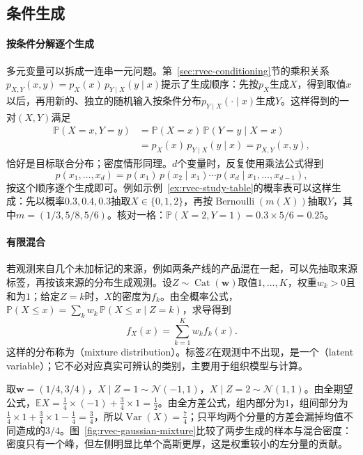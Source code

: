 \subsection{条件生成}

\paragraph{按条件分解逐个生成}
多元变量可以拆成一连串一元问题。第~\ref{sec:rvec-conditioning}节的乘积关系$p_{X,Y}(x,y)=p_X(x)\,p_{Y\mid X}(y\mid x)$提示了生成顺序：先按$p_X$生成$X$，得到取值$x$以后，再用新的、独立的随机输入按条件分布$p_{Y\mid X}(\cdot\mid x)$生成$Y$。这样得到的一对$(X,Y)$满足
\[
\begin{aligned}
 \mathbb P(X=x,Y=y)&=\mathbb P(X=x)\,\mathbb P(Y=y\mid X=x)\\
 &=p_X(x)\,p_{Y\mid X}(y\mid x)=p_{X,Y}(x,y),
\end{aligned}
\]
恰好是目标联合分布；密度情形同理。$d$个变量时，反复使用乘法公式得到
\[
 p(x_1,\ldots,x_d)=p(x_1)\,p(x_2\mid x_1)\cdots p(x_d\mid x_1,\ldots,x_{d-1}),
\]
按这个顺序逐个生成即可。例如示例~\ref{ex:rvec-study-table}的概率表可以这样生成：先以概率$0.3,0.4,0.3$抽取$X\in\{0,1,2\}$，再按$\operatorname{Bernoulli}(m(X))$抽取$Y$，其中$m=(1/3,5/8,5/6)$。核对一格：$\mathbb P(X=2,Y=1)=0.3\times5/6=0.25$。

\paragraph{有限混合}
若观测来自几个未加标记的来源，例如两条产线的产品混在一起，可以先抽取来源标签，再按该来源的分布生成观测。设$Z\sim\operatorname{Cat}(\bm w)$取值$1,\ldots,K$，权重$w_k>0$且和为$1$；给定$Z=k$时，$X$的密度为$f_k$。由全概率公式，$\mathbb P(X\le x)=\sum_kw_k\,\mathbb P(X\le x\mid Z=k)$，求导得到
\[
 f_X(x)=\sum_{k=1}^Kw_kf_k(x).
\]
这样的分布称为（mixture distribution）。标签$Z$在观测中不出现，是一个（latent variable）；它不必对应真实可辨认的类别，主要用于组织模型与计算。

\begin{example}[两个高斯分量的混合]
\label{ex:rvec-gaussian-mixture}
取$\bm w=(1/4,3/4)$，$X\mid Z=1\sim\mathcal N(-1,1)$，$X\mid Z=2\sim\mathcal N(1,1)$。由全期望公式，$\mathbb EX=\frac14\times(-1)+\frac34\times1=\frac12$。由全方差公式，组内部分为$1$，组间部分为$\frac14\times1+\frac34\times1-\frac14=\frac34$，所以$\operatorname{Var}(X)=\frac74$；只平均两个分量的方差会漏掉均值不同造成的$3/4$。图~\ref{fig:rvec-gaussian-mixture}比较了两步生成的样本与混合密度：密度只有一个峰，但左侧明显比单个高斯更厚，这是权重较小的左分量的贡献。
\end{example}

